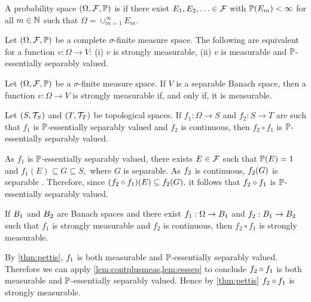 A probability space $\OFP$ is  if there exist $E_1,E_2,\ldots \in \mathcal F$ with $\mathbb P(E_m) < \infty$ for all $m \in \mathbb N$ such that $\Omega = \cup_{m=1}^\infty E_m.$
\ede

\label{thm:pettis}
Let $\OFP$ be a complete $\sigma$-finite measure space. The following are equivalent for a function $v:\Omega \rightarrow V$:
(i) $v$ is  strongly measurable,
(ii) $v$ is measurable and $\mathbb P$-essentially separably valued.
\enth

\label{cor:pettis}
Let $\OFP$ be a $\sigma$-finite measure space. If $V$ is a separable Banach space, then a function $v:\Omega\rightarrow V$ is strongly measurable if, and only if, it is measurable.
\eco

\label{lem:esssep}
Let $\mleft(S,\TS\mright)$ and $\mleft(T,\TopT\mright)$ be topological spaces. If $f_1:\Omega \rightarrow S$ and $f_2:S\rightarrow T$ are such that $f_1$ is $\mathbb P$-essentially separably valued and $f_2$ is continuous, then $f_2\circ f_1$ is $\mathbb P$-essentially separably valued.
\ele

As $f_1$ is $\mathbb P$-essentially separably valued, there exists $E \in \mathcal F$ such that $\mathbb P(E) = 1$ and $f_1(E) \subseteq G \subseteq S,$ where $G$ is separable. As $f_{2}$ is continuous, $f_{2}(G)$ is separable \cite[Theorem 16.4(a)]{Wi:70}. Therefore, since $\mleft(\ft \circ\fo\mright)(E) \subseteq \ft(G),$ it follows that $f_{2}\circ f_{1}$ is $\mathbb P$-essentially separably valued.
\epf



\label{lem:contplusstrong}
If $B_{1}$ and $B_{2}$ are Banach spaces and there exist $f_1:\Omega \rightarrow B_{1}$ and $f_2:B_{1}\rightarrow B_{2}$ such that $f_1$ is strongly measurable and $f_2$ is continuous, then $f_2\circ f_1$ is strongly measurable.
\ele

By \cref{thm:pettis}, $f_{1}$ is both measurable and $\mathbb P$-essentially separably valued. Therefore we can apply \cref{lem:contplusmeas,lem:esssep} to conclude $f_{2} \circ f_{1}$ is both measurable and $\mathbb P$-essentially separably valued. Hence by \cref{thm:pettis} $f_{2}\circ f_{1}$ is strongly measurable.
\epf

